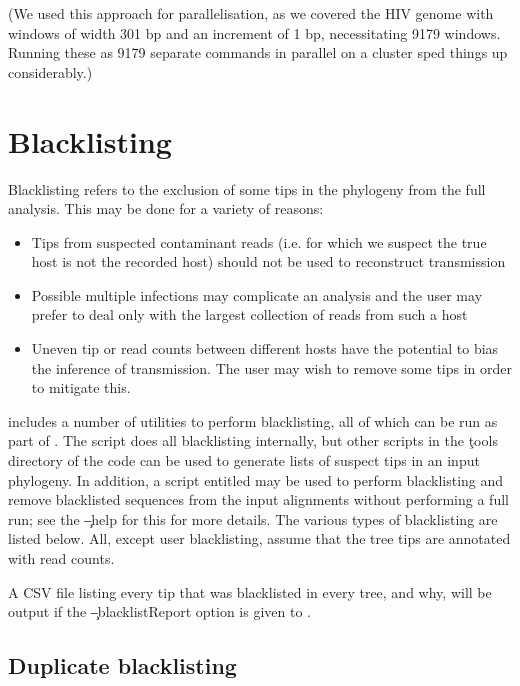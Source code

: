 (We used this approach for parallelisation, as we covered the HIV genome with windows of width 301 bp and an increment of 1 bp, necessitating 9179 windows.
Running these as 9179 separate commands in parallel on a cluster sped things up considerably.)

\section{Blacklisting} \label{sec:Blacklisting}

Blacklisting refers to the exclusion of some tips in the phylogeny from the full analysis.
This may be done for a variety of reasons:
\begin{itemize}
\item Tips from suspected contaminant reads (i.e. for which we suspect the true host is not the recorded host) should not be used to reconstruct transmission
\item Possible multiple infections may complicate an analysis and the user may prefer to deal only with the largest collection of reads from such a host
\item Uneven tip or read counts between different hosts have the potential to bias the inference of transmission.
The user may wish to remove some tips in order to mitigate this.
\end{itemize}
\p includes a number of utilities to perform blacklisting, all of which can be run as part of \pat.
The script does all blacklisting internally, but other scripts in the \c{tools} directory of the \p code can be used to generate lists of suspect tips in an input phylogeny. In addition, a script entitled \pcl may be used to perform blacklisting and remove blacklisted sequences from the input alignments without performing a full \p run; see the \c{--help} for this for more details.
The various types of blacklisting are listed below.
All, except user blacklisting, assume that the tree tips are annotated with read counts.

A CSV file listing every tip that was blacklisted in every tree, and why, will be output if the \c{--blacklistReport} option is given to \pat.

\subsection{Duplicate blacklisting} \label{sec:DupBlacklisting}

